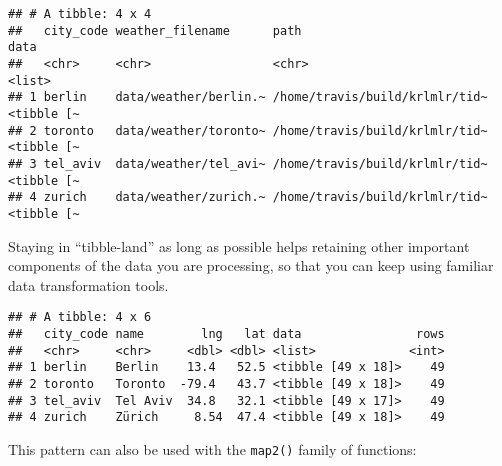 \documentclass[]{book}
\newenvironment{Shaded}{\begin{snugshade}}{\end{snugshade}}
\newcommand{\DataTypeTok}[1]{\textcolor[rgb]{0.13,0.29,0.53}{#1}}
\newcommand{\DecValTok}[1]{\textcolor[rgb]{0.00,0.00,0.81}{#1}}
\newcommand{\KeywordTok}[1]{\textcolor[rgb]{0.13,0.29,0.53}{\textbf{#1}}}
\newcommand{\NormalTok}[1]{#1}
\newcommand{\OperatorTok}[1]{\textcolor[rgb]{0.81,0.36,0.00}{\textbf{#1}}}
\newcommand{\StringTok}[1]{\textcolor[rgb]{0.31,0.60,0.02}{#1}}
\begin{document}
\begin{verbatim}
## # A tibble: 4 x 4
##   city_code weather_filename      path                           data      
##   <chr>     <chr>                 <chr>                          <list>    
## 1 berlin    data/weather/berlin.~ /home/travis/build/krlmlr/tid~ <tibble [~
## 2 toronto   data/weather/toronto~ /home/travis/build/krlmlr/tid~ <tibble [~
## 3 tel_aviv  data/weather/tel_avi~ /home/travis/build/krlmlr/tid~ <tibble [~
## 4 zurich    data/weather/zurich.~ /home/travis/build/krlmlr/tid~ <tibble [~
\end{verbatim}

Staying in ``tibble-land'' as long as possible helps retaining other important components of the data you are processing, so that you can keep using familiar data transformation tools.

\begin{Shaded}
\end{Shaded}

\begin{verbatim}
## # A tibble: 4 x 6
##   city_code name        lng   lat data                rows
##   <chr>     <chr>     <dbl> <dbl> <list>             <int>
## 1 berlin    Berlin    13.4   52.5 <tibble [49 x 18]>    49
## 2 toronto   Toronto  -79.4   43.7 <tibble [49 x 18]>    49
## 3 tel_aviv  Tel Aviv  34.8   32.1 <tibble [49 x 17]>    49
## 4 zurich    Zürich     8.54  47.4 <tibble [49 x 18]>    49
\end{verbatim}

This pattern can also be used with the \texttt{map2()} family of functions:

\begin{Shaded}
\end{Shaded}
\end{document}
